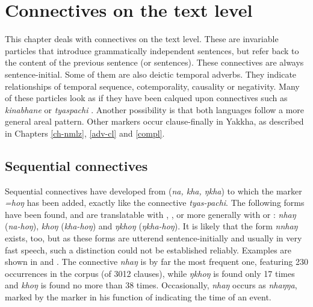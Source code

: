 ﻿\chapter{Connectives on the text level}\label{clink-rest}


This chapter deals with connectives on the text level. These are invariable particles that introduce grammatically independent sentences, but refer back to the content of the previous sentence (or sentences).  These connectives are always sentence-initial. Some of them are also deictic temporal adverbs. They indicate relationships of temporal sequence, cotemporality, causality or negativity. Many of these particles look as if they have been calqued upon  connectives such as  \emph{kinabhane}  or \emph{tyaspachi} . Another possibility is that both languages follow a more general areal pattern. Other   markers occur clause-finally in Yakkha, as described in Chapters  \ref{ch-nmlz}, \ref{adv-cl} and \ref{compl}.

\section{Sequential connectives}

Sequential connectives have developed from  (\emph{na, kha, ŋkha}) to which  the  marker \emph{=hoŋ} 
has been added, exactly like the  connective \emph{tyas-pachi}. The following forms have been found, and are translatable with , , or more generally with  or : \emph{nhaŋ} (\emph{na-hoŋ}), \emph{khoŋ} (\emph{kha-hoŋ}) and \emph{ŋkhoŋ} (\emph{ŋkha-hoŋ}). It is likely that the form \emph{nnhaŋ} exists, too, but as these forms are utterend sentence-initially and usually in very fast speech, such a distinction could not be established reliably. Examples are shown in  \Next and \NNext. The connective \emph{nhaŋ} is by far the most frequent one, featuring 230 occurrences in the corpus (of 3012 clauses), while \emph{ŋkhoŋ} is found only 17 times and \emph{khoŋ} is found no more than 38 times. Occasionally, \emph{nhaŋ} occurs as \emph{nhaŋŋa}, marked by the  marker in his function of indicating the time of an event.

